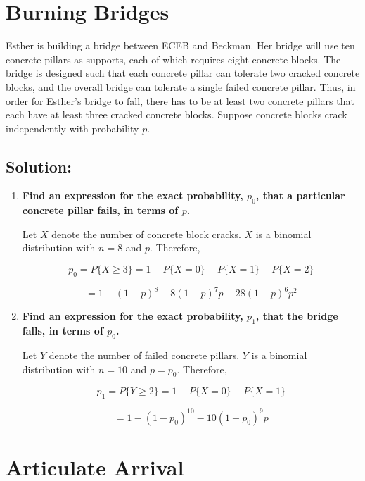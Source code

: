 \documentclass{article}
\begin{document}
\newpage

\section{Burning Bridges}

Esther is building a bridge between ECEB and Beckman. Her bridge will use ten concrete pillars as supports, each of which requires eight concrete blocks. The bridge is designed such that each concrete pillar can tolerate two cracked concrete blocks, and the overall bridge can tolerate a single failed concrete pillar. Thus, in order for Esther's bridge to fall, there has to be at least two concrete pillars that each have at least three cracked concrete blocks. Suppose concrete blocks crack independently with probability $p$.

\subsection{Solution:}

\begin{enumerate}[label=(\alph*)]
    \item \textbf{Find an expression for the exact probability, $p_0$, that a particular concrete pillar fails, in terms of $p$.}

    Let $X$ denote the number of concrete block cracks. $X$ is a binomial distribution with $n = 8$ and $p$. Therefore,

    $$p_0 = P\{X \geq 3\} = 1 - P\{X = 0\} - P\{X = 1\} - P\{X = 2\}$$

    $$= \boxed{1 - (1-p)^8 - 8(1-p)^7p - 28(1 - p)^6p^2}$$

    \vspace{3cm}
    
    \item \textbf{Find an expression for the exact probability, $p_1$, that the bridge falls, in terms of $p_0$.}

    Let $Y$ denote the number of failed concrete pillars. $Y$ is a binomial distribution with $n = 10$ and $p = p_0$. Therefore,

    $$p_1 = P\{Y \geq 2\} = 1 - P\{X = 0\} - P\{X = 1\}$$

    $$= \boxed{1 - (1-p_0)^{10} - 10(1-p_0)^9p}$$
\end{enumerate}

\newpage

\section{Articulate Arrival}
\end{document}
